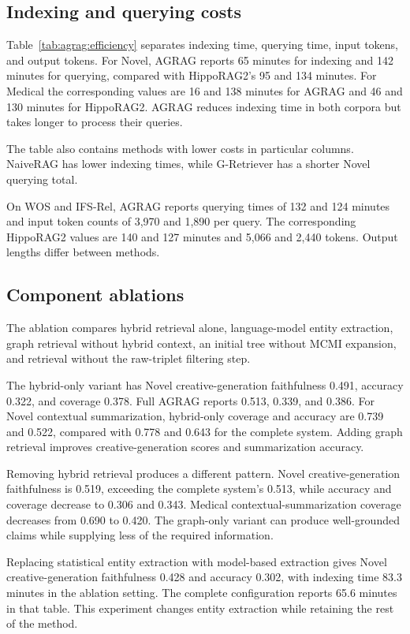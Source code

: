 \subsection{Indexing and querying costs}

Table~\ref{tab:agrag:efficiency} separates indexing time, querying time, input tokens, and output tokens. For Novel, AGRAG reports 65 minutes for indexing and 142 minutes for querying, compared with HippoRAG2's 95 and 134 minutes. For Medical the corresponding values are 16 and 138 minutes for AGRAG and 46 and 130 minutes for HippoRAG2. AGRAG reduces indexing time in both corpora but takes longer to process their queries.

The table also contains methods with lower costs in particular columns. NaiveRAG has lower indexing times, while G-Retriever has a shorter Novel querying total.

On WOS and IFS-Rel, AGRAG reports querying times of 132 and 124 minutes and input token counts of 3,970 and 1,890 per query. The corresponding HippoRAG2 values are 140 and 127 minutes and 5,066 and 2,440 tokens. Output lengths differ between methods.

\subsection{Component ablations}

The ablation compares hybrid retrieval alone, language-model entity extraction, graph retrieval without hybrid context, an initial tree without MCMI expansion, and retrieval without the raw-triplet filtering step.

The hybrid-only variant has Novel creative-generation faithfulness 0.491, accuracy 0.322, and coverage 0.378. Full AGRAG reports 0.513, 0.339, and 0.386. For Novel contextual summarization, hybrid-only coverage and accuracy are 0.739 and 0.522, compared with 0.778 and 0.643 for the complete system. Adding graph retrieval improves creative-generation scores and summarization accuracy.

Removing hybrid retrieval produces a different pattern. Novel creative-generation faithfulness is 0.519, exceeding the complete system's 0.513, while accuracy and coverage decrease to 0.306 and 0.343. Medical contextual-summarization coverage decreases from 0.690 to 0.420. The graph-only variant can produce well-grounded claims while supplying less of the required information.

Replacing statistical entity extraction with model-based extraction gives Novel creative-generation faithfulness 0.428 and accuracy 0.302, with indexing time 83.3 minutes in the ablation setting. The complete configuration reports 65.6 minutes in that table. This experiment changes entity extraction while retaining the rest of the method.

